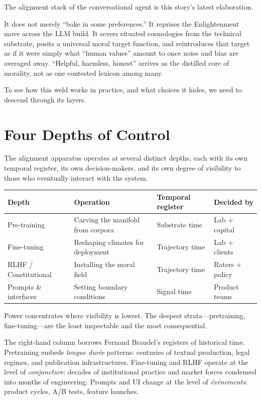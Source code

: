 The alignment stack of the conversational agent is this story's latest elaboration.

It does not merely ``bake in some preferences.'' It reprises the Enlightenment move across the LLM build. It severs situated cosmologies from the technical substrate, posits a universal moral target function, and reintroduces that target as if it were simply what ``human values'' amount to once noise and bias are averaged away. ``Helpful, harmless, honest'' arrives as the distilled core of morality, not as one contested lexicon among many.

To see how this weld works in practice, and what choices it hides, we need to descend through its layers.

\section{Four Depths of Control}

The alignment apparatus operates at several distinct depths, each with its own temporal register, its own decision-makers, and its own degree of visibility to those who eventually interact with the system.

\begin{formalbox}[title={Four Depths of Control}]
\begin{tabular}{p{2.5cm} p{3.5cm} p{3cm} p{2.5cm}}
\textbf{Depth} & \textbf{Operation} & \textbf{Temporal register} & \textbf{Decided by} \\
\hline
Pre-training & Carving the manifold from corpora & Substrate time & Lab + capital \\
Fine-tuning & Reshaping climates for deployment & Trajectory time & Lab + clients \\
RLHF / Constitutional & Installing the moral field & Trajectory time & Raters + policy \\
Prompts \& interfaces & Setting boundary conditions & Signal time & Product teams \\
\end{tabular}

Power concentrates where visibility is lowest. The deepest strata---pretraining, fine-tuning---are the least inspectable and the most consequential.
\end{formalbox}

The right-hand column borrows Fernand Braudel's registers of historical time. Pretraining embeds \emph{longue dur\'ee} patterns: centuries of textual production, legal regimes, and publication infrastructures. Fine-tuning and RLHF operate at the level of \emph{conjoncture}: decades of institutional practice and market forces condensed into months of engineering. Prompts and UI change at the level of \emph{\'ev\'enements}: product cycles, A/B tests, feature launches.

